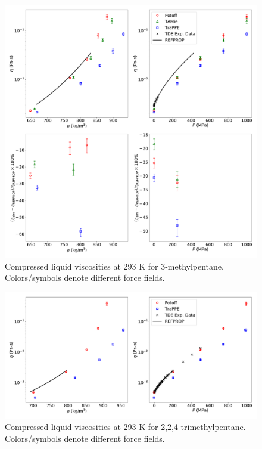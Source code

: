 \documentclass[preprint,review,12pt]{elsarticle}
\begin{document}
	\begin{figure}[htb!]
		\centering
		\includegraphics[width=6.4in]{compare_REFPROP_T293highP_3MPentane.pdf}
		\caption{Compressed liquid viscosities at 293 K for 3-methylpentane. Colors/symbols denote different force fields.}
		\label{fig:T293highP_3MP}
	\end{figure} 
	
	\begin{figure}[htb!]
		\centering
		\includegraphics[width=6.4in]{compare_REFPROP_T293highP_IC8H18_without_devPlots.pdf}
		\caption{Compressed liquid viscosities at 293 K for 2,2,4-trimethylpentane. Colors/symbols denote different force fields.}
		\label{fig:T293highP_IC8}
	\end{figure} 
	
\end{document}
